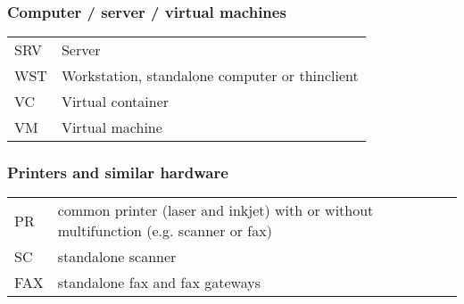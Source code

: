 \subsubsection{Computer / server / virtual machines}

\begin{tabular}{p{1.4cm}p{15cm}}
	SRV	& Server \\

	WST	& Workstation, standalone computer or thinclient \\

	VC	& Virtual container \\

	VM	& Virtual machine \\
\end{tabular}



\subsubsection{Printers and similar hardware}

\begin{tabular}{p{1.4cm}p{15cm}}
	PR	& common printer (laser and inkjet) with or without multifunction (e.g.
		scanner or fax) \\

	SC	& standalone scanner \\

	FAX	& standalone fax and fax gateways \\
\end{tabular}
